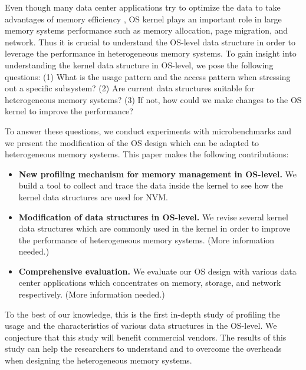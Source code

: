 \documentclass{sig-alternate}
\begin{document}
Even though many data center applications try to optimize the data to take advantages of memory efficiency \cite{dulloor2016data}, OS kernel plays an important role in large memory systems performance such as memory allocation, page migration, and network. Thus it is crucial to understand the OS-level data structure in order to leverage the performance in heterogeneous memory systems. To gain insight into understanding the kernel data structure in OS-level, we pose the following questions: (1) What is the usage pattern and the access pattern when stressing out a specific subsystem? (2) Are current data structures suitable for heterogeneous memory systems? (3) If not, how could we make changes to the OS kernel to improve the performance?

 To answer these questions, we conduct experiments with microbenchmarks and we present the modification of the OS design which can be adapted to heterogeneous memory systems. This paper makes the following contributions:

\begin{itemize}
\item \textbf{New profiling mechanism for memory management in OS-level.} We build a tool to collect and trace the data inside the kernel to see how the kernel data structures are used for NVM.

\item  \textbf{Modification of data structures in OS-level.} We revise several kernel data structures which are commonly used in the kernel in order to improve the performance of heterogeneous memory systems. (More information needed.)

\item \textbf{Comprehensive evaluation.} We evaluate our OS design with various data center applications which concentrates on memory, storage, and network respectively. (More information needed.)
\end{itemize}
 
To the best of our knowledge, this is the first in-depth study of profiling the usage and the characteristics of various data structures in the OS-level. We conjecture that this study will benefit commercial vendors. The results of this study can help the researchers to understand and to overcome the overheads when designing the heterogeneous memory systems.
\end{document}
